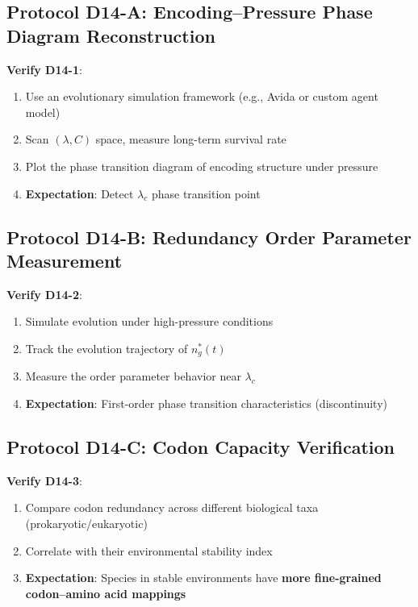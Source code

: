 \documentclass[12pt,a4paper]{article}
\newcommand{\lamc}{\lambda_c}
\newcommand{\nbgr}{n_g^*}
\begin{document}
\subsection{Protocol D14-A: Encoding--Pressure Phase Diagram Reconstruction}

\textbf{Verify D14-1}:
\begin{enumerate}
    \item Use an evolutionary simulation framework (e.g., Avida or custom agent model)
    \item Scan $(\lambda, C)$ space, measure long-term survival rate
    \item Plot the phase transition diagram of encoding structure under pressure
    \item \textbf{Expectation}: Detect $\lamc$ phase transition point
\end{enumerate}

\subsection{Protocol D14-B: Redundancy Order Parameter Measurement}

\textbf{Verify D14-2}:
\begin{enumerate}
    \item Simulate evolution under high-pressure conditions
    \item Track the evolution trajectory of $\nbgr(t)$
    \item Measure the order parameter behavior near $\lamc$
    \item \textbf{Expectation}: First-order phase transition characteristics (discontinuity)
\end{enumerate}

\subsection{Protocol D14-C: Codon Capacity Verification}

\textbf{Verify D14-3}:
\begin{enumerate}
    \item Compare codon redundancy across different biological taxa (prokaryotic/eukaryotic)
    \item Correlate with their environmental stability index
    \item \textbf{Expectation}: Species in stable environments have \textbf{more fine-grained codon--amino acid mappings}
\end{enumerate}
\end{document}
